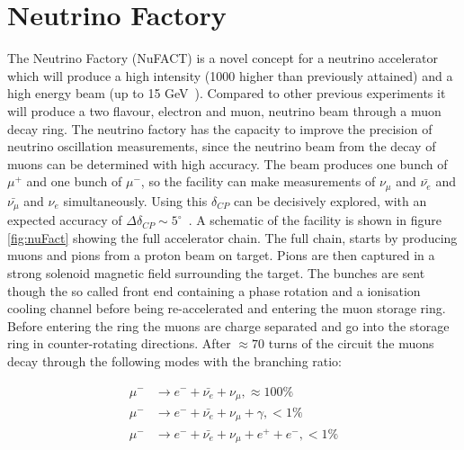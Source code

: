 \section{Neutrino Factory}\label{subsec:nuFACT}
The Neutrino Factory (NuFACT) is a novel concept for a neutrino accelerator which will produce a high intensity (1000 higher than previously attained) and a high energy beam (up to 15 GeV~\cite{Fix7}). Compared to other previous experiments it will produce a two flavour, electron and muon, neutrino beam through a muon decay ring. The neutrino factory has the capacity to improve the precision of neutrino oscillation measurements, since the neutrino beam from the decay of muons can be determined with high accuracy. The beam produces one bunch of $\mu^+$ and one bunch of $\mu^-$, so the facility can make measurements of $\nu_{\mu}$ and $\bar{\nu_{e}}$ and $\bar{\nu_{\mu}}$ and $\nu_{e}$ simultaneously. Using this $\delta_{CP}$ can be decisively explored, with an expected accuracy of $\Delta \delta_{CP}\sim 5^\circ$~\cite{25NUfact}. A schematic of the facility is shown in figure \ref{fig:nuFact} showing the full accelerator chain. The full chain, starts by producing muons and pions from a proton beam on target. Pions are then captured in a strong solenoid magnetic field surrounding the target. The bunches are sent though the so called front end containing a phase rotation and a ionisation cooling channel before being re-accelerated and entering the muon storage ring. Before entering the ring the muons are charge separated and go into the storage ring in counter-rotating directions. After $\approx 70$ turns of the circuit the muons decay through the following modes with the branching ratio:


\begin{align}
\mu^- &\rightarrow e^- + \bar{\nu_e} + \nu_\mu, \approx 100\% \\
\mu^- &\rightarrow e^- + \bar{\nu_e} + \nu_\mu + \gamma, <1\% \\
\mu^- &\rightarrow e^- + \bar{\nu_e} + \nu_\mu + e^+ + e^-, <1\%
\end{align}

